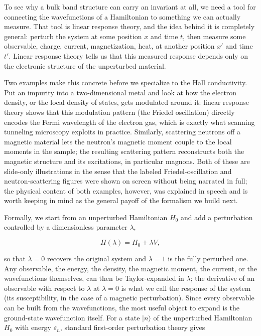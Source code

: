To see why a bulk band structure can carry an invariant at all, we need a tool for connecting the
wavefunctions of a Hamiltonian to something we can actually measure. That tool is linear response
theory, and the idea behind it is completely general: perturb the system at some position $x$ and
time $t$, then measure some observable, charge, current, magnetization, heat, at another position
$x'$ and time $t'$. Linear response theory tells us that this measured response depends only on the
electronic structure of the unperturbed material.

Two examples make this concrete before we specialize to the Hall conductivity. Put an impurity into
a two-dimensional metal and look at how the electron density, or the local density of states, gets
modulated around it: linear response theory shows that this modulation pattern (the Friedel
oscillation) directly encodes the Fermi wavelength of the electron gas, which is exactly what
scanning tunneling microscopy exploits in practice. Similarly, scattering neutrons off a magnetic
material lets the neutron's magnetic moment couple to the local moments in the sample; the resulting
scattering pattern reconstructs both the magnetic structure and its excitations, in particular
magnons. Both of these are slide-only illustrations in the sense that the labeled Friedel-oscillation
and neutron-scattering figures were shown on screen without being narrated in full; the physical
content of both examples, however, was explained in speech and is worth keeping in mind as the
general payoff of the formalism we build next.

Formally, we start from an unperturbed Hamiltonian $H_0$ and add a perturbation controlled by a
dimensionless parameter $\lambda$,

\begin{equation*}
H(\lambda) = H_0 + \lambda V,
\end{equation*}

so that $\lambda = 0$ recovers the original system and $\lambda = 1$ is the fully perturbed one. Any
observable, the energy, the density, the magnetic moment, the current, or the wavefunctions
themselves, can then be Taylor-expanded in $\lambda$; the derivative of an observable with respect to
$\lambda$ at $\lambda = 0$ is what we call the response of the system (its susceptibility, in the
case of a magnetic perturbation). Since every observable can be built from the wavefunctions, the
most useful object to expand is the ground-state wavefunction itself. For a state $|n\rangle$ of the
unperturbed Hamiltonian $H_0$ with energy $\varepsilon_n$, standard first-order perturbation theory
gives

